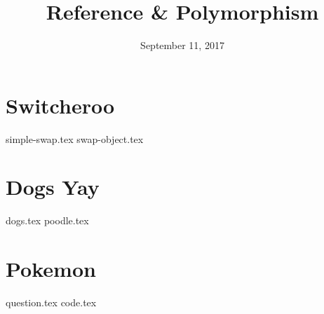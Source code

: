 \documentclass[11pt]{exam}
\title{Reference \& Polymorphism}
\date{September 11, 2017}
\begin{document}
\maketitle

\section{Switcheroo}
\begin{questions}
{simple-swap.tex}
{swap-object.tex}
\end{questions}

\clearpage

\section{Dogs Yay}
\begin{questions}
{dogs.tex}
{poodle.tex}
\end{questions}

\clearpage

\section{Pokemon}
\begin{questions}
{question.tex}
{code.tex}
\end{questions}
\end{document}
